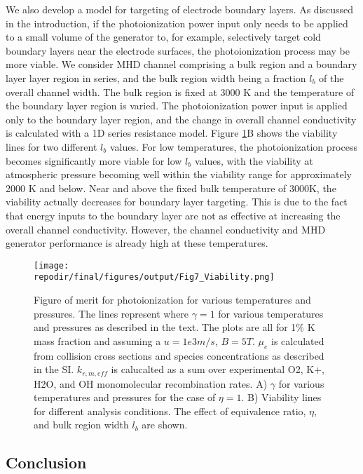 We also develop a model for targeting of electrode boundary layers. As discussed in the introduction, if the photoionization power input only needs to be applied to a small volume of the generator to, for example, selectively target cold boundary layers near the electrode surfaces, the photoionization process may be more viable. We consider MHD channel comprising a bulk region and a boundary layer layer region in series, and the bulk region width being a fraction $l_b$ of the overall channel width. The bulk region is fixed at 3000 K and the temperature of the boundary layer region is varied. The photoionization power input is applied only to the boundary layer region, and the change in overall channel conductivity is calculated with a 1D series resistance model. Figure \ref{fig:viability_gamma}B shows the viability lines for two different $l_b$ values. For low temperatures, the photoionization process becomes significantly more viable for low $l_b$ values, with the viability at atmospheric pressure becoming well within the viability range for approximately 2000 K and below. Near and above the fixed bulk temperature of 3000K, the viability actually decreases for boundary layer targeting. This is due to the fact that energy inputs to the boundary layer are not as effective at increasing the overall channel conductivity. However, the channel conductivity and MHD generator performance is already high at these temperatures. 


\begin{figure}[h]
    \centering
    \texttt{[image: \\repodir/final/figures/output/Fig7\_Viability.png]} 
    \caption{Figure of merit for photoionization for various temperatures and pressures. The lines represent where $\gamma = 1$ for various temperatures and pressures as described in the text.   The plots are all for 1\% K mass fraction and assuming a $u=1e3 m/s$, $B=5T$. $\mu_e$ is calculated from collision cross sections and species concentrations as described in the SI. $k_{r,m,eff}$ is calucalted as a sum over experimental O2, K+, H2O,
and OH monomolecular recombination rates. A) $\gamma$ for various temperatures and pressures for the case of $\eta=1$. B) Viability lines for different analysis conditions. The effect of equivalence ratio, $\eta$, and bulk region width $l_b$ are shown.}
    \label{fig:viability_gamma}
\end{figure}



\subsection{Conclusion}

